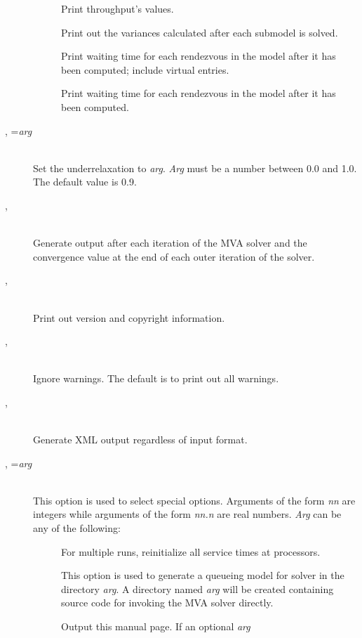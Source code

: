 \begin{description}
\begin{description}
\item[]
Print throughput's values.
\item[]
Print out the variances calculated after each submodel is solved.
\item[]
Print waiting time for each rendezvous in the model after it has been computed; include virtual entries.
\item[]
Print waiting time for each rendezvous in the model after it has been computed.
\end{description}
\item[\flag{u}{}, \longopt{underrelaxation}=\emph{arg}]~\\
Set the underrelaxation to \emph{arg}.
\emph{Arg} must be a number between 0.0 and 1.0.
The default value is 0.9.
\item[\flag{v}{}, \longopt{verbose}]~\\
Generate output after each iteration of the MVA solver and the convergence value at the end of each outer iteration of the solver.
\item[\flag{V}{}, \longopt{version}]~\\
Print out version and copyright information.
\item[\flag{w}{}, \longopt{no-warnings}]~\\
Ignore warnings.  The default is to print out all warnings.
\item[\flag{x}{}, \longopt{xml}]~\\
Generate XML output regardless of input format.
\item[\flag{z}{}, \longopt{special}=\emph{arg}]~\\
This option is used to select special options.  Arguments of the form
\emph{nn} are integers while arguments of the form \emph{nn.n} are real
numbers.  \emph{Arg} can be any of the following:
\begin{description}
\item[]
For multiple runs, reinitialize all service times at processors.
\item[]
This option is used to generate a queueing model for solver in the directory \emph{arg}.
A directory named \emph{arg} will be created containing source code for invoking the MVA solver directly.
\item[]
Output this manual page.  
If an optional \emph{arg}

\end{description}
\end{description}
